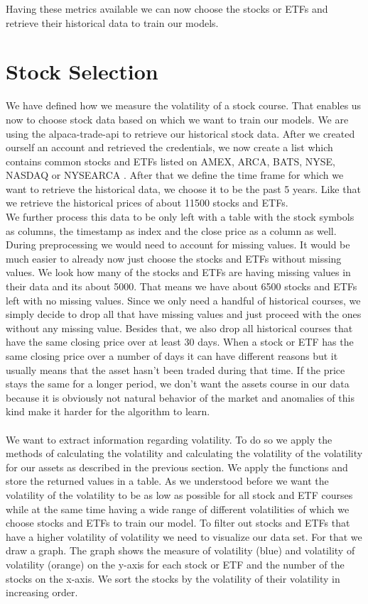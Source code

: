 \documentclass[a4paper,12pt]{report}
\begin{document}
Having these metrics available we can now choose the stocks or ETFs and retrieve their historical data to train our models.


	\section{Stock Selection}
	We have defined how we measure the volatility of a stock course. That enables us now to choose stock data based on which we want to train our models. We are using the alpaca-trade-api to retrieve our historical stock data. After we created ourself an account and retrieved the credentials, we now create a list which contains common stocks and ETFs listed on AMEX, ARCA, BATS, NYSE, NASDAQ or NYSEARCA \cite{18}. After that we define the time frame for which we want to retrieve the historical data, we choose it to be the past 5 years. Like that we retrieve the historical prices of about 11500 stocks and ETFs. \\
	We further process this data to be only left with a table with the stock symbols as columns, the timestamp as index and the close price as a column as well. During preprocessing we would need to account for missing values. It would be much easier to already now just choose the stocks and ETFs without missing values. We look how many of the stocks and ETFs are having missing values in their data and its about 5000. That means we have about 6500 stocks and ETFs left with no missing values. Since we only need a handful of historical courses, we simply decide to drop all that have missing values and just proceed with the ones without any missing value. Besides that, we also drop all historical courses that have the same closing price over at least 30 days. When a stock or ETF has the same closing price over a number of days it can have different reasons but it usually means that the asset hasn’t been traded during that time. If the price stays the same for a longer period, we don’t want the assets course in our data because it is obviously not natural behavior of the market and anomalies of this kind make it harder for the algorithm to learn. \\\\
	
	We want to extract information regarding volatility. To do so we apply the methods of calculating the volatility and calculating the volatility of the volatility for our assets as described in the previous section. We apply the functions and store the returned values in a table. As we understood before we want the volatility of the volatility to be as low as possible for all stock and ETF courses while at the same time having a wide range of different volatilities of which we choose stocks and ETFs to train our model. To filter out stocks and ETFs that have a higher volatility of volatility we need to visualize our data set. For that we draw a graph. The graph shows the measure of volatility (blue) and volatility of volatility (orange) on the y-axis for each stock or ETF and the number of the stocks on the x-axis. We sort the stocks by the volatility of their volatility in increasing order.\\
	
\end{document}
